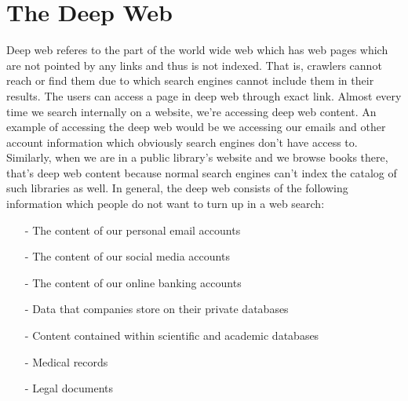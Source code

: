 \documentclass[12pt]{article}
\begin{document}
\section*{The Deep Web}
Deep web referes to the part of the world wide web which has web pages which
are not pointed by any links and thus is not indexed. That is, crawlers cannot
reach or find them due to which search engines cannot include them in their
results. The users can access a page in deep web through exact link.
Almost every time we search internally on a website, we’re accessing deep web
content. An example of accessing the deep web would be we accessing our emails
and other account information which obviously search engines don't have access to.
Similarly, when we are in a public library's website and we browse books there,
that's deep web content because normal search engines can't index the catalog
of such libraries as well. In general, the deep web consists of the following
information which people do not want to turn up in a web search:
\begin{itemize}
    \item [-] The content of our personal email accounts
    \item [-] The content of our social media accounts
    \item [-] The content of our online banking accounts
    \item [-] Data that companies store on their private databases
    \item [-] Content contained within scientific and academic databases
    \item [-] Medical records
    \item [-] Legal documents
\end{itemize}
\end{document}
